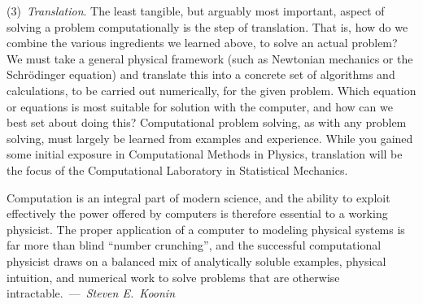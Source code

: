 \documentclass[12pt]{mcplain}
\begin{document}
(3)~\textit{Translation}. The least tangible, but arguably most important,
aspect of solving a problem computationally is the step of translation. That is,
how do we combine the various ingredients we learned above, to solve an actual
problem? We must take a general physical framework (such as Newtonian mechanics
or the Schr\"odinger equation) and translate this into a concrete set of
algorithms and calculations, to be carried out numerically, for the given
problem. Which equation or equations is most suitable for solution with the
computer, and how can we best set about doing this? Computational problem
solving, as with any problem solving, must largely be learned from examples and
experience.  While you gained some initial exposure in Computational Methods in
Physics, translation will be the focus of the Computational Laboratory in
Statistical Mechanics.


\begin{leftindent}[0.5in]
 \footnotesize
 Computation is an integral part of modern science, and the ability to exploit
 effectively the power offered by computers is therefore essential to a working
 physicist.  The proper application of a computer to modeling physical systems
 is far more than blind ``number crunching'', and the successful computational
 physicist draws on a balanced mix of analytically soluble examples, physical
 intuition, and numerical work to solve problems that are otherwise
 intractable.~---~\textit{Steven E.~Koonin}
\end{leftindent}
%
%
\end{document}
